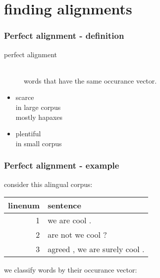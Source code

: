 \section{finding alignments}{

  \begin{frame}
    \frametitle{Perfect alignment - definition}
    \begin{description}
      \item[perfect alignment] \ \\
        words that have the same occurance vector.
    \end{description}
    \begin{itemize}
      \item scarce
        \\ \hspace{2em} in {\Large large} corpus
        \\ \hspace{2em} mostly hapaxes
      \item plentiful
        \\ \hspace{2em}in {\small small} corpus
    \end{itemize}
  \end{frame}

  \begin{frame}
    \frametitle{Perfect alignment - example}

    consider this alingual corpus: \\
    \vspace{0.5em}

    \hspace{10pt}
    \begin{tabular}{r | l }
      linenum & sentence \\
      \hline
      1 & we are cool .
      \\
      2 & are not we cool ?
      \\
      3 & agreed , we are surely cool .
      \\
    \end{tabular}




    \vspace{2em}
    we classify words by their occurance vector: \\


\end{frame}}
